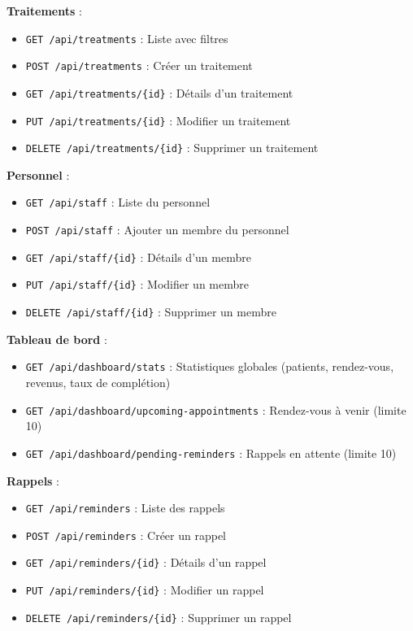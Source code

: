 \documentclass[12pt,a4paper]{report}
\begin{document}
\textbf{Traitements} :
\begin{itemize}
    \item \texttt{GET /api/treatments} : Liste avec filtres
    \item \texttt{POST /api/treatments} : Créer un traitement
    \item \texttt{GET /api/treatments/\{id\}} : Détails d'un traitement
    \item \texttt{PUT /api/treatments/\{id\}} : Modifier un traitement
    \item \texttt{DELETE /api/treatments/\{id\}} : Supprimer un traitement
\end{itemize}

\textbf{Personnel} :
\begin{itemize}
    \item \texttt{GET /api/staff} : Liste du personnel
    \item \texttt{POST /api/staff} : Ajouter un membre du personnel
    \item \texttt{GET /api/staff/\{id\}} : Détails d'un membre
    \item \texttt{PUT /api/staff/\{id\}} : Modifier un membre
    \item \texttt{DELETE /api/staff/\{id\}} : Supprimer un membre
\end{itemize}

\textbf{Tableau de bord} :
\begin{itemize}
    \item \texttt{GET /api/dashboard/stats} : Statistiques globales (patients, rendez-vous, revenus, taux de complétion)
    \item \texttt{GET /api/dashboard/upcoming-appointments} : Rendez-vous à venir (limite 10)
    \item \texttt{GET /api/dashboard/pending-reminders} : Rappels en attente (limite 10)
\end{itemize}

\textbf{Rappels} :
\begin{itemize}
    \item \texttt{GET /api/reminders} : Liste des rappels
    \item \texttt{POST /api/reminders} : Créer un rappel
    \item \texttt{GET /api/reminders/\{id\}} : Détails d'un rappel
    \item \texttt{PUT /api/reminders/\{id\}} : Modifier un rappel
    \item \texttt{DELETE /api/reminders/\{id\}} : Supprimer un rappel
\end{itemize}
\end{document}
